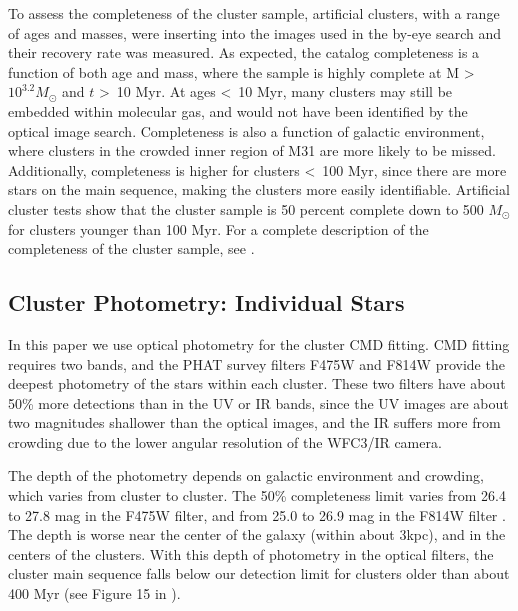 \documentclass{emulateapj}
\begin{document}
To assess the completeness of the cluster sample, artificial clusters, with a range of ages and masses, were inserting into the images used in the by-eye search and their recovery rate was measured.  As expected, the catalog completeness is a function of both age and mass, where the sample is highly complete at M \textgreater\ $10^{3.2}M_{\odot}$ and $t$ \textgreater\ 10 Myr.  At ages \textless\ 10 Myr, many clusters may still be embedded within molecular gas, and would not have been identified by the optical image search.  Completeness is also a function of galactic environment, where clusters in the crowded inner region of M31 are more likely to be missed.  Additionally, completeness is higher for clusters \textless\ 100 Myr, since there are more stars on the main sequence, making the clusters more easily identifiable.  Artificial cluster tests show that the cluster sample is 50 percent complete down to 500 $M_{\odot}$  for clusters younger than 100 Myr.  For a complete description of the completeness of the cluster sample, see \cite{Johnson15}.


\subsection{Cluster Photometry:  Individual Stars}\label{sec:phot}

In this paper we use optical photometry for the cluster CMD fitting.  CMD fitting requires two bands, and the PHAT survey filters F475W and F814W provide the deepest photometry of the stars within each cluster.  These two filters have about 50\% more detections than in the UV or IR bands, since the UV images are about two magnitudes shallower than the optical images, and the IR suffers more from crowding due to the lower angular resolution of the WFC3/IR camera.  

The depth of the photometry depends on galactic environment and crowding, which varies from cluster to cluster.  The 50\% completeness limit varies from 26.4 to 27.8 mag in the F475W filter, and from 25.0 to 26.9 mag in the F814W filter \citep{Lewis15}.  The depth is worse near the center of the galaxy (within about 3kpc), and in the centers of the clusters.  With this depth of photometry in the optical filters, the cluster main sequence falls below our detection limit for clusters older than about 400 Myr (see Figure 15 in \cite{Lewis15}).
\end{document}
